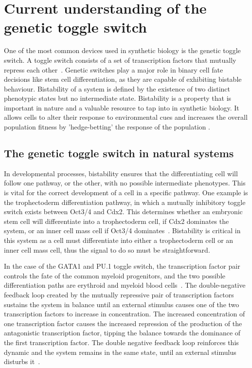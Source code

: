 


\section{Current understanding of the genetic toggle switch}

One of the most common devices used in synthetic biology is the genetic toggle switch. A toggle switch consists of a set of transcription factors that mutually repress each other~\autocite{Gardner:2000vha}. Genetic switches play a major role in binary cell fate decisions like stem cell differentiation, as they are capable of exhibiting bistable behaviour. Bistability of a system is defined by the existence of two distinct phenotypic states but no intermediate state. Bistability is a property that is important in nature and a valuable resource to tap into in synthetic biology. It allows cells to alter their response to environmental cues and increases the overall population fitness by 'hedge-betting' the response of the population \autocite{Veening:2008da}. 

\subsection{The genetic toggle switch in natural systems}
In developmental processes, bistability ensures that the differentiating cell will follow one pathway, or the other, with no possible intermediate phenotypes. This is vital for the correct development of a cell in a specific pathway. One example is the trophectoderm differentiation pathway, in which a mutually inhibitory toggle switch exists between Oct3/4 and Cdx2. This determines whether an embryonic stem cell will differentiate into a trophectoderm cell, if Cdx2 dominates the system, or an inner cell mass cell if Oct3/4 dominates~\autocite{Niwa:2005fz}. Bistability is critical in this system as a cell must differentiate into either a trophectoderm cell or an inner cell mass cell, thus the signal to do so must be straightforward. 

In the case of the GATA1 and PU.1 toggle switch, the transcription factor pair controls the fate of the common myeloid progenitors, and the two possible differentiation paths are erythroid and myeloid blood cells~\autocite{Chickarmane:2009by}. The double-negative feedback loop created by the mutually repressive pair of transcription factors sustains the system in balance until an external stimulus causes one of the two transcription factors to increase in concentration. The increased concentration of one transcription factor causes the increased repression of the production of the antagonistic transcription factor, tipping the balance towards the dominance of the first transcription factor. The double negative feedback loop reinforces this dynamic and the system remains in the same state, until an external stimulus disturbs it~\autocite{FerrellJr:2002fh}.

